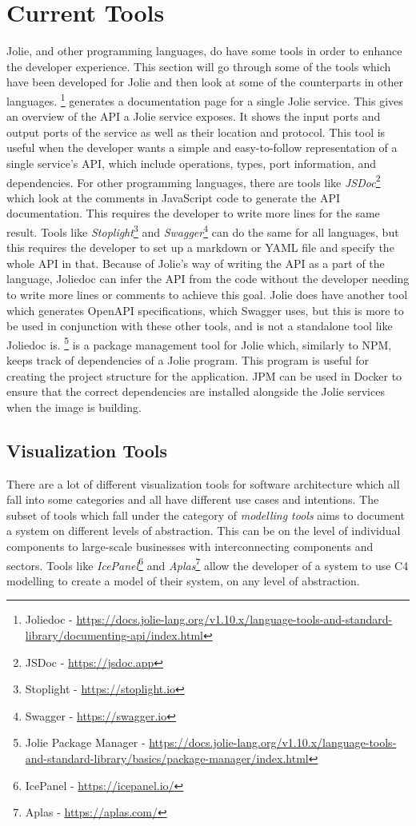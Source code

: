\section{Current Tools}
Jolie, and other programming languages, do have some tools in order to enhance the developer experience. This section will go through some of the tools
which have been developed for Jolie and then look at some of the counterparts in other languages.
%
\footnote{Joliedoc - \url{https://docs.jolie-lang.org/v1.10.x/language-tools-and-standard-library/documenting-api/index.html}} generates a documentation page for a single Jolie service. This gives an overview of the API a Jolie service exposes. It shows the input ports and output ports of the service as well as their location and protocol.
This tool is useful when the developer wants a simple and easy-to-follow representation of a single service's API, which include operations, types, port information, and dependencies.
For other programming languages, there are tools like \textit{JSDoc}\footnote{JSDoc - \url{https://jsdoc.app}} which look at the comments in JavaScript code to generate the API documentation. This requires the developer to write more lines for the same result.
Tools like \textit{Stoplight}\footnote{Stoplight - \url{https://stoplight.io}} and \textit{Swagger}\footnote{Swagger - \url{https://swagger.io}} can do the same for all languages, but this requires the developer to set up a markdown or YAML file and specify the whole API in that.
Because of Jolie's way of writing the API as a part of the language, Joliedoc can infer the API from the code without the developer needing to write more lines or comments to achieve this goal.
Jolie does have another tool which generates OpenAPI specifications, which Swagger uses, but this is more to be used in conjunction with these other tools, and is not a standalone tool like Joliedoc is.
\footnote{Jolie Package Manager - \url{https://docs.jolie-lang.org/v1.10.x/language-tools-and-standard-library/basics/package-manager/index.html}} is a package management tool for Jolie which, similarly to NPM, keeps track of dependencies of a Jolie program.
This program is useful for creating the project structure for the application. JPM can be used in Docker to ensure that the correct dependencies are installed alongside the Jolie services when the image is building.

\subsection{Visualization Tools}
There are a lot of different visualization tools for software architecture which all fall into some categories and all have different use cases and intentions.
The subset of tools which fall under the category of \textit{modelling tools} aims to document a system on different levels of abstraction. This can be on the level of individual components to large-scale businesses with interconnecting components and sectors.
Tools like \textit{IcePanel}\footnote{IcePanel - \url{https://icepanel.io/}} and \textit{Aplas}\footnote{Aplas - \url{https://aplas.com/}} allow the developer of a system to use C4 modelling to create a model of their system, on any level of abstraction.

